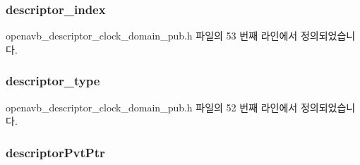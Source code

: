\subsubsection[{\texorpdfstring{descriptor\+\_\+index}{descriptor_index}}]{ descriptor\+\_\+index}\hypertarget{structopenavb__aem__descriptor__clock__domain__t_ab26fb363c24b9a2a4391f9171c981b08}{}\label{structopenavb__aem__descriptor__clock__domain__t_ab26fb363c24b9a2a4391f9171c981b08}


openavb\+\_\+descriptor\+\_\+clock\+\_\+domain\+\_\+pub.\+h 파일의 53 번째 라인에서 정의되었습니다.

\subsubsection[{\texorpdfstring{descriptor\+\_\+type}{descriptor_type}}]{ descriptor\+\_\+type}\hypertarget{structopenavb__aem__descriptor__clock__domain__t_a1e231d7874aada5925b29affc76782cc}{}\label{structopenavb__aem__descriptor__clock__domain__t_a1e231d7874aada5925b29affc76782cc}


openavb\+\_\+descriptor\+\_\+clock\+\_\+domain\+\_\+pub.\+h 파일의 52 번째 라인에서 정의되었습니다.

\subsubsection[{\texorpdfstring{descriptor\+Pvt\+Ptr}{descriptorPvtPtr}}]{ descriptor\+Pvt\+Ptr}\hypertarget{structopenavb__aem__descriptor__clock__domain__t_a302e92fd6cf4d398d5305395359fb157}{}\label{structopenavb__aem__descriptor__clock__domain__t_a302e92fd6cf4d398d5305395359fb157}


